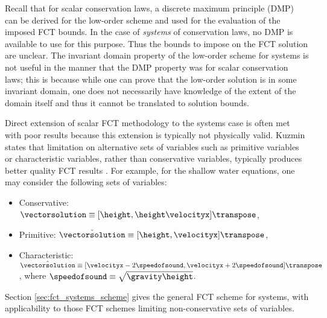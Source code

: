 Recall that for scalar conservation laws, a discrete maximum principle (DMP) can
be derived for the low-order scheme and used for the evaluation of the
imposed FCT bounds. In the case of \emph{systems} of conservation laws,
no DMP is available to use for this purpose. Thus the bounds to impose on
the FCT solution are unclear. The invariant domain property of the low-order
scheme for systems is not useful in the manner that the DMP property was
for scalar conservation laws; this is because while one can prove that the
low-order solution is in some invariant domain, one does not necessarily
have knowledge of the extent of the domain itself and thus it cannot
be translated to solution bounds.

Direct extension of scalar FCT methodology to the systems case is often met
with poor results because this extension is typically not physically valid.
Kuzmin states that limitation on alternative sets of variables such as
primitive variables or characteristic variables, rather than conservative
variables, typically produces better quality FCT results \cite{kuzmin_FCT}.
For example, for the shallow water equations, one may consider the
following sets of variables:
\begin{itemize}
  \item Conservative:
    $\vectorsolution \equiv [\height,\height\velocityx]\transpose$,
  \item Primitive:
    $\check{\vectorsolution} \equiv [\height,\velocityx]\transpose$,
  \item Characteristic:
    $\hat{\vectorsolution} \equiv [\velocityx-2\speedofsound,
      \velocityx+2\speedofsound]\transpose$,
      where $\speedofsound\equiv\sqrt{\gravity\height}$.
\end{itemize}
Section \ref{sec:fct_systems_scheme} gives the general FCT scheme for systems,
with applicability to those FCT schemes limiting non-conservative sets of
variables.
